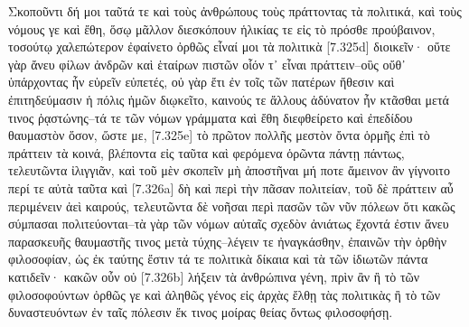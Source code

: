 \documentclass[12pt]{book}
\begin{document}
\begin{pairs}
\begin{Rightside}
\begin{Ancient Greek}
\beginnumbering
\pstart
Σκοποῦντι δή μοι ταῦτά τε καὶ τοὺς ἀνθρώπους τοὺς πράττοντας τὰ πολιτικά, καὶ τοὺς νόμους γε καὶ ἔθη, ὅσῳ μᾶλλον διεσκόπουν ἡλικίας τε εἰς τὸ πρόσθε προύβαινον, τοσούτῳ χαλεπώτερον ἐφαίνετο ὀρθῶς εἶναί μοι τὰ πολιτικὰ [7.325d] διοικεῖν· οὔτε γὰρ ἄνευ φίλων ἀνδρῶν καὶ ἑταίρων πιστῶν οἷόν τ᾽ εἶναι πράττειν--οὓς οὔθ᾽ ὑπάρχοντας ἦν εὑρεῖν εὐπετές, οὐ γὰρ ἔτι ἐν τοῖς τῶν πατέρων ἤθεσιν καὶ ἐπιτηδεύμασιν ἡ πόλις ἡμῶν διῳκεῖτο, καινούς τε ἄλλους ἀδύνατον ἦν κτᾶσθαι μετά τινος ῥᾳστώνης--τά τε τῶν νόμων γράμματα καὶ ἔθη διεφθείρετο καὶ ἐπεδίδου θαυμαστὸν ὅσον, ὥστε με, [7.325e] τὸ πρῶτον πολλῆς μεστὸν ὄντα ὁρμῆς ἐπὶ τὸ πράττειν τὰ κοινά, βλέποντα εἰς ταῦτα καὶ φερόμενα ὁρῶντα πάντῃ πάντως, τελευτῶντα ἰλιγγιᾶν, καὶ τοῦ μὲν σκοπεῖν μὴ ἀποστῆναι μή ποτε ἄμεινον ἂν γίγνοιτο περί τε αὐτὰ ταῦτα καὶ [7.326a] δὴ καὶ περὶ τὴν πᾶσαν πολιτείαν, τοῦ δὲ πράττειν αὖ περιμένειν ἀεὶ καιρούς, τελευτῶντα δὲ νοῆσαι περὶ πασῶν τῶν νῦν πόλεων ὅτι κακῶς σύμπασαι πολιτεύονται--τὰ γὰρ τῶν νόμων αὐταῖς σχεδὸν ἀνιάτως ἔχοντά ἐστιν ἄνευ παρασκευῆς θαυμαστῆς τινος μετὰ τύχης--λέγειν τε ἠναγκάσθην, ἐπαινῶν τὴν ὀρθὴν φιλοσοφίαν, ὡς ἐκ ταύτης ἔστιν τά τε πολιτικὰ δίκαια καὶ τὰ τῶν ἰδιωτῶν πάντα κατιδεῖν· κακῶν οὖν οὐ [7.326b] λήξειν τὰ ἀνθρώπινα γένη, πρὶν ἂν ἢ τὸ τῶν φιλοσοφούντων ὀρθῶς γε καὶ ἀληθῶς γένος εἰς ἀρχὰς ἔλθῃ τὰς πολιτικὰς ἢ τὸ τῶν δυναστευόντων ἐν ταῖς πόλεσιν ἔκ τινος μοίρας θείας ὄντως φιλοσοφήσῃ.	
\pend
\endnumbering
\end{Ancient Greek}
\end{Rightside}
\begin{Leftside}
\begin{English}
\beginnumbering
\pstart

\end{English}
\end{Leftside}
\end{pairs}
\end{document}
